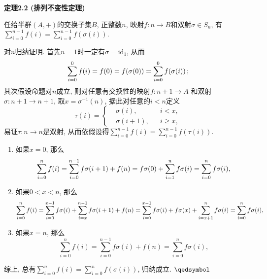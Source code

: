 \documentclass[UTF8]{ctexart}
\begin{document}
\vspace{13pt}

\hypertarget{sec:定理2.2}{}
\noindent\textbf{定理2.2 (排列不变性定理)}

\vspace{-3pt}
任给半群$(A,+)$的交换子集$B$, 正整数$n$, 映射$f:n\to B$和双射$\sigma\in S_n$,
有$\displaystyle\sum_{i=0}^{n-1}f(i)=\sum_{i=0}^{n-1}f(\sigma(i))$.


对$n$归纳证明. 首先$n=1$时一定有$\sigma=\mathrm{id}_1$, 从而
\vspace{3pt}
\[
    \sum_{i=0}^0f(i)=f(0)=f(\sigma(0))=\sum_{i=0}^0f(\sigma(i))\,;\\[3pt]
\]
其次假设命题对$n$成立, 则对任意有交换性的映射$f:n+1\to A$
和双射$\sigma:n+1\to n+1$, 取$x=\sigma^{-1}(n)$, 据此对任意的$i<n$定义
\[\tau(i)=\left\{\begin{aligned}
    &\sigma(i),&&i<x,\\[-3pt]
    &\sigma(i+1),&&i\geqslant x,    
\end{aligned}\right.\]
易证$\tau:n\to n$是双射, 从而依假设得$\displaystyle
\sum_{i=0}^{n-1}f(i)=\sum_{i=0}^{n-1}f(\tau(i))$.

\begin{enumerate}
    \item 如果$x=0$, 那么
    \vspace{3pt}
    \[
        \sum_{i=0}^nf(i)=\sum_{i=0}^{n-1}f\sigma(i+1)+f(n)=
        f\sigma(0)+\sum_{i=1}^nf\sigma(i)=\sum_{i=0}^nf\sigma(i),\\[3pt]
    \]
    \item 如果$0<x<n$, 那么
    \vspace{3pt}
    \[
        \sum_{i=0}^nf(i)=\sum_{i=0}^{x-1}f\sigma(i)+
        \sum_{i=x}^{n-1}f\sigma(i+1)+f(n)=
        \sum_{i=0}^{x-1}f\sigma(i)+f\sigma(x)+\sum_{i=x+1}^nf\sigma(i)=
        \sum_{i=0}^nf\sigma(i),\\[3pt]
    \]
    \item 如果$x=n$, 那么
    \vspace{3pt}
    \[
        \sum_{i=0}^nf(i)=\sum_{i=0}^{n-1}f\sigma(i)+f(n)=
        \sum_{i=0}^nf\sigma(i),
    \]
\end{enumerate}

综上, 总有$\displaystyle\sum_{i=0}^nf(i)=\sum_{i=0}^nf(\sigma(i))$, 归纳成立.
\hfill $\qedsymbol$
\end{document}
